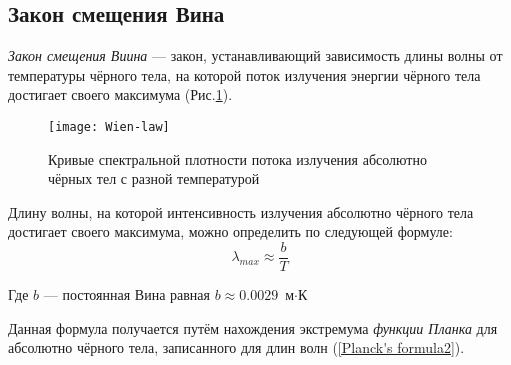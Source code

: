 \subsection{Закон смещения Вина}
\textit{Закон смещения Виина} --- закон, устанавливающий зависимость длины волны от температуры чёрного тела, на которой поток излучения энергии чёрного тела достигает своего максимума (Рис.\ref{pic:wien-law}).

\begin{center}
\end{center}

\begin{figure}[h!]
\begin{center}
\texttt{[image: Wien-law]}
\end{center}
\caption{Кривые спектральной плотности потока излучения абсолютно чёрных тел с разной температурой}\label{pic:wien-law}
\end{figure}

Длину волны, на которой интенсивность излучения абсолютно чёрного тела достигает своего максимума, можно определить по следующей формуле:
\begin{equation}
\lambda_{max}\approx\frac{b}{T}
\end{equation}

Где $b$ --- постоянная Вина равная $b\approx0.0029 $ $\text{м} \cdot \text{К}$

Данная формула получается путём нахождения экстремума \textit{функции Планка} для абсолютно чёрного тела, записанного для длин волн (\ref{Planck's formula2}).

